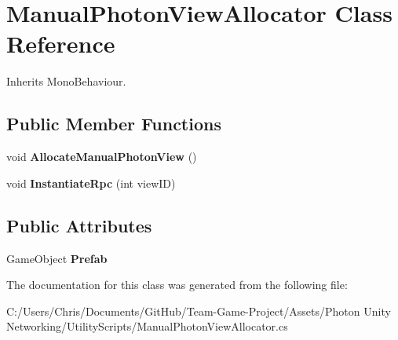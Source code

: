\hypertarget{class_manual_photon_view_allocator}{}\section{Manual\+Photon\+View\+Allocator Class Reference}
\label{class_manual_photon_view_allocator}


Inherits Mono\+Behaviour.

\subsection*{Public Member Functions}
\begin{DoxyCompactItemize}
\item 
void {\bfseries Allocate\+Manual\+Photon\+View} ()\hypertarget{class_manual_photon_view_allocator_a8a0cd5af4b8c807c81d3d3bbdb07d78a}{}\label{class_manual_photon_view_allocator_a8a0cd5af4b8c807c81d3d3bbdb07d78a}

\item 
void {\bfseries Instantiate\+Rpc} (int view\+ID)\hypertarget{class_manual_photon_view_allocator_ac7091a7bd0abf0ad38fe4b42b501b9a4}{}\label{class_manual_photon_view_allocator_ac7091a7bd0abf0ad38fe4b42b501b9a4}

\end{DoxyCompactItemize}
\subsection*{Public Attributes}
\begin{DoxyCompactItemize}
\item 
Game\+Object {\bfseries Prefab}\hypertarget{class_manual_photon_view_allocator_a52b754e26b5972eb97a7645789c7f393}{}\label{class_manual_photon_view_allocator_a52b754e26b5972eb97a7645789c7f393}

\end{DoxyCompactItemize}


The documentation for this class was generated from the following file\+:\begin{DoxyCompactItemize}
\item 
C\+:/\+Users/\+Chris/\+Documents/\+Git\+Hub/\+Team-\/\+Game-\/\+Project/\+Assets/\+Photon Unity Networking/\+Utility\+Scripts/Manual\+Photon\+View\+Allocator.\+cs\end{DoxyCompactItemize}
